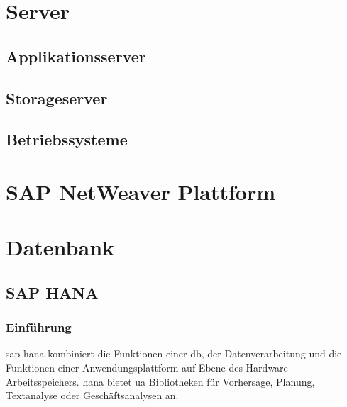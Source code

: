 \section{Server}

\subsection{Applikationsserver}
\label{sec:app-server}

\subsection{Storageserver}
\label{sec:stor-server}

\subsection{Betriebssysteme}
\label{sec:server-os}

\section{SAP NetWeaver Plattform}
\label{sec:netweaver}

\section{Datenbank}

\subsection{SAP HANA}
\label{sec:db-hana}

\subsubsection{Einführung}
\label{sec:db-hana-intro}
\gls{sap} \gls{hana} kombiniert die Funktionen einer \gls{db}, der Datenverarbeitung und die Funktionen einer Anwendungsplattform auf Ebene des Hardware Arbeitsspeichers. \gls{hana} bietet \gls{ua} Bibliotheken für Vorhersage, Planung, Textanalyse oder Geschäftsanalysen an.\\

